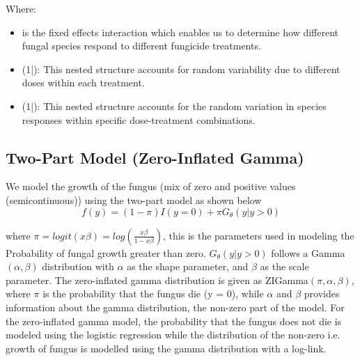 \documentclass[
  10pt,
  letterpaper,
  twocolumn]{article}
\begin{document}
\vspace{-0.3cm}
Where:
\begin{itemize}
\setlength{\itemsep}{0pt}
\setlength{\parskip}{0pt}
\item {} \times {} is the fixed effects interaction which enables us to determine how different fungal species respond to different fungicide treatments.
\item (1|): This nested structure accounts for random variability due to different doses within each treatment.
\item (1|): This nested structure accounts for the random variation in species responses within specific dose-treatment combinations.
\end{itemize}

\vspace{-0.1cm}
\subsection*{Two-Part Model (Zero-Inflated Gamma)}
\vspace{-0.2cm}

We model the growth of the fungus (mix of zero and positive values (semicontinuous)) using the two-part model as shown below
\begin{equation}
f(y) = (1 - \pi) I(y = 0) + \pi G_\theta(y| y > 0)
\end{equation}

\vspace{-0.3cm}
where $\pi = logit(x\beta) = log (\frac{x\beta}{1-x\beta})$, this is the parameters used in modeling the Probability of fungal growth greater than zero. $G_\theta(y| y > 0)$ follows a Gamma $(\alpha,\beta)$ distribution with $\alpha$ as the shape parameter, and $\beta$ as the scale parameter. The zero-inflated gamma distribution is given as ZIGamma$(\pi, \alpha,\beta)$, where $\pi$ is the probability that the fungus die (y = 0), while $\alpha$ and $\beta$ provides information about the gamma distribution, the non-zero part of the model. For the zero-inflated gamma model, the probability that the fungus does not die is modeled using the logistic regression while the distribution of the non-zero i.e. growth of fungus is modelled using the gamma distribution with a log-link.
\end{document}
